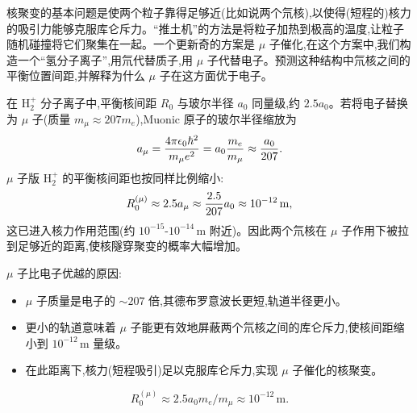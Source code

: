 \begin{question}
核聚变的基本问题是使两个粒子靠得足够近(比如说两个氘核),以使得(短程的)核力的吸引力能够克服库仑斥力。“推土机”的方法是将粒子加热到极高的温度,让粒子随机碰撞将它们聚集在一起。一个更新奇的方案是 $\mu$ 子催化,在这个方案中,我们构造一个“氢分子离子”,用氘代替质子,用 $\mu$ 子代替电子。预测这种结构中氘核之间的平衡位置间距,并解释为什么 $\mu$ 子在这方面优于电子。
\begin{solution}
在 $\mathrm H_2^+$ 分子离子中,平衡核间距 $R_0$ 与玻尔半径 $a_0$ 同量级,约 $2.5a_0$。若将电子替换为 $\mu$ 子(质量 $m_\mu\approx207m_e$),Muonic 原子的玻尔半径缩放为
\[
a_\mu={4\pi\epsilon_0\hbar^2\over m_\mu e^2}=a_0{m_e\over m_\mu}\approx{a_0\over207}.
\]
$\mu$ 子版 $\mathrm H_2^+$ 的平衡核间距也按同样比例缩小:
\[
R_0^{(\mu)}\approx2.5a_\mu\approx{2.5\over207}a_0\approx10^{-12}\,\mathrm{m},
\]
这已进入核力作用范围(约 $10^{-15}\text{-}10^{-14}\,\mathrm{m}$ 附近)。因此两个氘核在 $\mu$ 子作用下被拉到足够近的距离,使核隧穿聚变的概率大幅增加。

$\mu$ 子比电子优越的原因:
\begin{itemize}
\item $\mu$ 子质量是电子的 $\sim207$ 倍,其德布罗意波长更短,轨道半径更小。
\item 更小的轨道意味着 $\mu$ 子能更有效地屏蔽两个氘核之间的库仑斥力,使核间距缩小到 $10^{-12}\,\mathrm{m}$ 量级。
\item 在此距离下,核力(短程吸引)足以克服库仑斥力,实现 $\mu$ 子催化的核聚变。
\end{itemize}
\[
\boxed{R_0^{(\mu)}\approx{2.5a_0m_e/m_\mu}\approx10^{-12}\,\mathrm{m}}.
\]
\end{solution}
\end{question}

